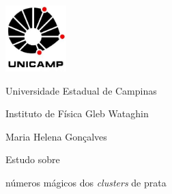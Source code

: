 \pagestyle{plain}
\thispagestyle{empty}
\vspace{-5cm}
\includegraphics[width=.94\textwidth, height=1in,
keepaspectratio=true]{logos/logo_Unicamp}

\begin{center}
{\Large {\sc Universidade Estadual de Campinas \\}

Instituto de Física  Gleb Wataghin \\
\vspace{0.5cm}
}

\vspace{0.5cm}
{\large Maria Helena Gonçalves}\\ 
\vspace{3.5cm}
{\huge Estudo sobre

\bigskip

números mágicos dos \textit{clusters} de prata}

\vspace{2.5cm}

\end{center}

\begin{center}



\vspace{2.7cm}







\end{center}

\vspace{2cm}

\begin{center}

 \\
 \\

\end{center}

\newpage

$ $

\newpage
